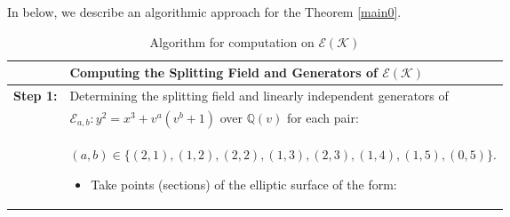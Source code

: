 \documentclass[11pt]{amsart}
\newcommand{\Ee}{{\mathcal E}}
\newcommand{\KK}{{\mathcal K}}
\numberwithin{equation}{section}
\numberwithin{table}{section}
\newcommand\<{\langle}
\begin{document}
	
In below,   we describe an algorithmic approach for the   Theorem \ref{main0}.  


\begin{table}[htbp]
	\centering
	\caption{Algorithm for computation on $\mathcal{E}(\mathcal{K})$} 
	\label{tab:algorithm}
	\begin{tabularx}{\textwidth}{@{} l X @{}} 
		\toprule
		& \textbf{Computing the Splitting Field and Generators of $\mathcal{E}(\mathcal{K})$} \\ 
		\midrule
		\textbf{Step 1:} & Determining the splitting field and linearly independent generators of\\
		& $\mathcal{E}_{a,b}: y^2=x^3+ v^a (v^b+1)$ over $\mathbb{Q}(v)$ for each pair: \\
	& 	$(a,b) \in \{ (2, 1), (1,2), (2, 2), (1, 3), (2, 3) , (1, 4) , (1, 5), (0, 5) \}$.
		
		\begin{itemize}[leftmargin=*, nosep, topsep=2pt]
			\item Take points (sections) of the elliptic surface of the form:
			

\end{itemize}
\end{tabularx}
\end{table}
\end{document}
